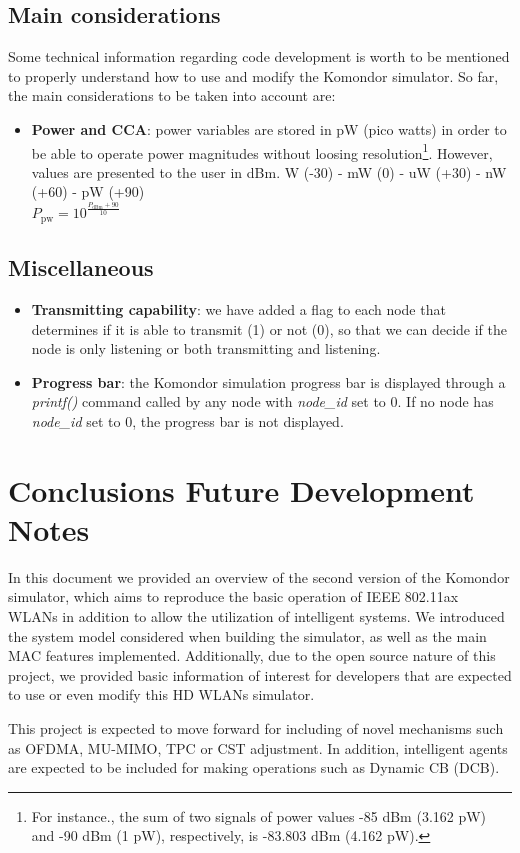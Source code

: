 \documentclass[a4paper]{article}
\begin{document}
	\subsection{Main considerations}
	\label{section:development_considerations}
	Some technical information regarding code development is worth to be mentioned to properly understand how to use and modify the Komondor simulator. So far, the main considerations to be taken into account are:		
	\begin{itemize}
	\item \textbf{Power and CCA}: power variables are stored in pW (pico watts) in order to be able to operate power magnitudes without loosing resolution\footnote{For instance., the sum of two signals of power values -85 dBm (3.162 pW) and -90 dBm (1 pW), respectively, is -83.803 dBm (4.162 pW).}. However, values are presented to the user in dBm.		
	W (-30)  - mW (0)  - uW (+30) - nW (+60) - pW (+90)\\
	$P_{\text{pw}} = 10^{\frac{P_{\text{dBm}} + 90}{10}}$
	\end{itemize}

	\subsection{Miscellaneous}
	\label{section:development_miscellany}
	\begin{itemize}
	\item \textbf{Transmitting capability}: we have added a flag to each node that determines if it is able to transmit (1) or not (0), so that we can decide if the node is only listening or both transmitting and listening.
	\item \textbf{Progress bar}: the Komondor simulation progress bar is displayed through a \textit{printf()} command called by any node with \textit{node\_id} set to 0. If no node has \textit{node\_id} set to 0, the progress bar is not displayed.
	\end{itemize}
	
\section{Conclusions Future Development Notes}
\label{section:conclusions}

In this document we provided an overview of the second version of the Komondor simulator, which aims to reproduce the basic operation of IEEE 802.11ax WLANs in addition to allow the utilization of intelligent systems. We introduced the system model considered when building the simulator, as well as the main MAC features implemented. Additionally, due to the open source nature of this project, we provided basic information of interest for developers that are expected to use or even modify this HD WLANs simulator.

This project is expected to move forward for including of novel mechanisms such as OFDMA, MU-MIMO, TPC or  CST adjustment. In addition, intelligent agents are expected to be included for making operations such as Dynamic CB (DCB).



\end{document}
